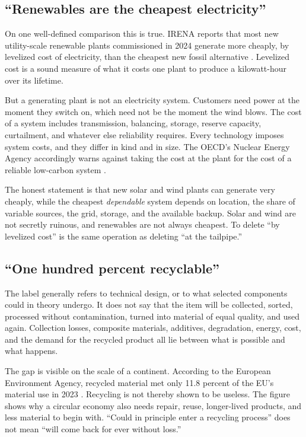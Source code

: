 \documentclass[12pt,a4paper]{book}
\begin{document}
\subsection{``Renewables are the cheapest electricity''}

On one well-defined comparison this is true. IRENA reports that most new utility-scale renewable plants commissioned in 2024 generate more cheaply, by levelized cost of electricity, than the cheapest new fossil alternative \cite{IRENARenewableCosts2024}. Levelized cost is a sound measure of what it costs one plant to produce a kilowatt-hour over its lifetime.

But a generating plant is not an electricity system. Customers need power at the moment they switch on, which need not be the moment the wind blows. The cost of a system includes transmission, balancing, storage, reserve capacity, curtailment, and whatever else reliability requires. Every technology imposes system costs, and they differ in kind and in size. The OECD's Nuclear Energy Agency accordingly warns against taking the cost at the plant for the cost of a reliable low-carbon system \cite{OECDNEASystemCosts2019}.

The honest statement is that new solar and wind plants can generate very cheaply, while the cheapest \emph{dependable} system depends on location, the share of variable sources, the grid, storage, and the available backup. Solar and wind are not secretly ruinous, and renewables are not always cheapest. To delete ``by levelized cost'' is the same operation as deleting ``at the tailpipe.''

\subsection{``One hundred percent recyclable''}

The label generally refers to technical design, or to what selected components could in theory undergo. It does not say that the item will be collected, sorted, processed without contamination, turned into material of equal quality, and used again. Collection losses, composite materials, additives, degradation, energy, cost, and the demand for the recycled product all lie between what is possible and what happens.

The gap is visible on the scale of a continent. According to the European Environment Agency, recycled material met only 11.8 percent of the EU's material use in 2023 \cite{EEACircularMaterialUse2024}. Recycling is not thereby shown to be useless. The figure shows why a circular economy also needs repair, reuse, longer-lived products, and less material to begin with. ``Could in principle enter a recycling process'' does not mean ``will come back for ever without loss.''
\end{document}
